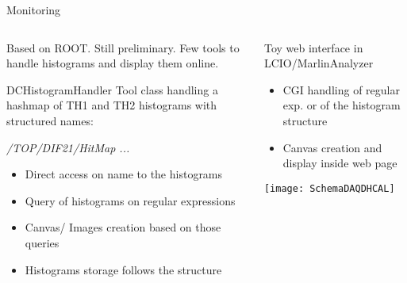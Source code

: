 \documentclass[10pt]{beamer}
\begin{document}
\begin{frame}[shrink=5]{Monitoring}

\begin{columns}
\begin{column}{0.5\textwidth}
\par
Based on ROOT. Still preliminary. Few tools to handle histograms and display them online.


\begin{block}{DCHistogramHandler}
Tool class handling a hashmap of TH1 and TH2 histograms with structured names:
\par
{\sl /TOP/DIF21/HitMap ... }
\begin{itemize}
\item Direct access on name to the histograms
\item Query of histograms on regular expressions
\item Canvas/ Images creation based on those queries
\item Histograms storage follows the structure
\end{itemize}


\end{block}
\end{column}
 \begin{column}{0.5\textwidth}
\pause \begin{block}{Toy web interface in LCIO/MarlinAnalyzer}
\begin{itemize}
  \item CGI handling of regular exp. or of the histogram structure
  \item Canvas creation and display inside web page
\end{itemize}
\end{block}

   \centerline{\texttt{[image: SchemaDAQDHCAL]}}

\end{column}
\end{columns}
\end{frame}
\end{document}
